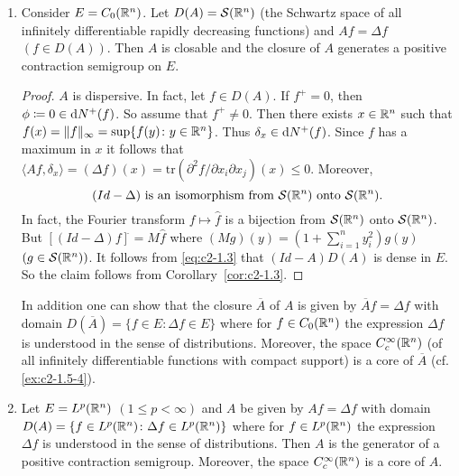 \begin{examples}
\begin{enumerate}[\upshape (i), wide, labelindent=.5em]
\begin{proof}
We have shown that $A$ is dispersive. 
As in \ref{ex:c2-1.5-1}   one shows that $(Id - A)$ is surjective. 
Now the claim follows from Theorem \ref{thm:c2-1.2}  .
\end{proof}
\item \label{ex:c2-1.5-3} 
Consider $E = C_{0}(\mathbb{R}^{n})$. 
Let $D(A) = \mathcal{S}(\mathbb{R}^{n})$ (the Schwartz space of all infinitely differentiable rapidly decreasing functions) and $Af = \Delta f$ $(f \in D(A))$. 
Then $A$ is closable and the closure of $A$ generates a positive contraction semigroup on $E$.
\begin{proof}
$A$ is dispersive. 
In fact, let $f \in D(A)$. 
If $f^{+} = 0$, then $\phi \coloneqq 0 \in \mathop{}\!\mathrm{d}{N^{+}}(f)$. 
So assume that $f^{+} \neq 0$. 
Then there exists $x \in \mathbb{R}^{n}$ such that $f(x) = \|f\|_{\infty} = \sup\{f(y) \colon y \in \mathbb{R}^{n}\}$. 
Thus $\delta_{x} \in \mathop{}\!\mathrm{d}{N^{+}}(f)$.
Since $f$ has a maximum in $x$ it follows that $\langle Af,\delta_{x} \rangle = (\Delta f)(x) = \text{tr}(\partial^{2}f/\partial x_{i}\partial x_{j})(x) \leq 0$. 
Moreover,
\begin{equation}\label{eq:c2-1.3}
(Id - \Delta) \text{ is an isomorphism from } \mathcal{S}(\mathbb{R}^{n}) \text{ onto } \mathcal{S}(\mathbb{R}^{n}).
\end{equation}
In fact, the Fourier transform $f \mapsto \hat{f}$ is a bijection from $\mathcal{S}(\mathbb{R}^{n})$ onto $\mathcal{S}(\mathbb{R}^{n})$.
But $[(Id - \Delta)f]^{\hat{}} = M\hat{f}$ where $(Mg)(y) = (1 + \sum_{i=1}^{n} y_{i}^{2})g(y)$ $(g \in \mathcal{S}(\mathbb{R}^{n}))$. It follows from \eqref{eq:c2-1.3}    that $(Id - A)D(A)$ is dense in $E$. So the claim follows from Corollary~\ref{cor:c2-1.3}.
\end{proof}
\begin{remark*}\label{rem:c2-1.2}
%
%
In addition one can show that the closure $\overline{A}$ of $A$ is given by $\overline{A}f = \Delta f$ with domain $D(\overline{A}) = \{f \in E \colon \Delta f \in E\}$ where for
$f \in C_{0}(\mathbb{R}^{n})$ the expression $\Delta f$ is understood in the sense of distributions. 
Moreover, the space $C_{c}^{\infty}(\mathbb{R}^{n})$ (of all infinitely differentiable functions with compact support) is a core of $\overline{A}$ (cf. \ref{ex:c2-1.5-4}).
\end{remark*}
\item \label{ex:c2-1.5-4} 
Let $E = L^{p}(\mathbb{R}^{n})$ $(1 \leq p < \infty)$ and $A$ be given by $Af = \Delta f$ with domain $D(A) = \{f \in L^{p}(\mathbb{R}^{n}) \colon \Delta f \in L^{p}(\mathbb{R}^{n})\}$ where for $f \in L^{p}(\mathbb{R}^{n})$ the expression $\Delta f$ is understood in the sense of distributions. Then $A$ is the generator of a positive contraction semigroup. Moreover, the space $C_{c}^{\infty}(\mathbb{R}^{n})$ is a core of $A$.

\end{enumerate}
\end{examples}
